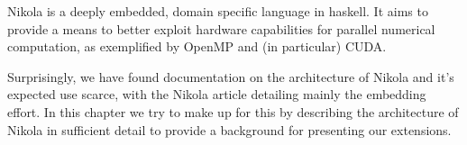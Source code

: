 
Nikola is a deeply embedded, domain specific language in haskell. It aims to
provide a means to better exploit hardware capabilities for parallel numerical
computation, as exemplified by OpenMP and (in particular) CUDA.

Surprisingly, we have found documentation on the architecture of Nikola and
it's expected use scarce, with the Nikola article \cite{mainland2010nikola}
detailing mainly the embedding effort. In this chapter we try to make up for
this by describing the architecture of Nikola in sufficient detail to provide a
background for presenting our extensions.


